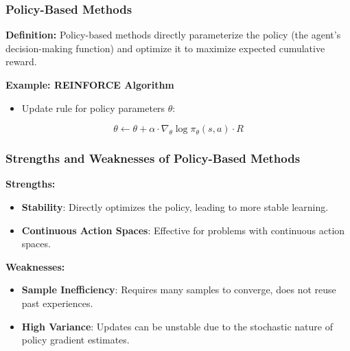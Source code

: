 \documentclass[aspectratio=169]{beamer}
\begin{document}
\begin{frame}[fragile]
    \frametitle{Policy-Based Methods}
    
    \textbf{Definition:} 
    Policy-based methods directly parameterize the policy (the agent's decision-making function) and optimize it to maximize expected cumulative reward.

    \textbf{Example: REINFORCE Algorithm}
    \begin{itemize}
        \item Update rule for policy parameters \( \theta \):
    \end{itemize}

    \begin{equation}
    \theta \leftarrow \theta + \alpha \cdot \nabla_\theta \log \pi_\theta(s, a) \cdot R
    \end{equation}
\end{frame}

\begin{frame}[fragile]
    \frametitle{Strengths and Weaknesses of Policy-Based Methods}

    \textbf{Strengths:}
    \begin{itemize}
        \item \textbf{Stability}: Directly optimizes the policy, leading to more stable learning.
        \item \textbf{Continuous Action Spaces}: Effective for problems with continuous action spaces.
    \end{itemize}

    \textbf{Weaknesses:}
    \begin{itemize}
        \item \textbf{Sample Inefficiency}: Requires many samples to converge, does not reuse past experiences.
        \item \textbf{High Variance}: Updates can be unstable due to the stochastic nature of policy gradient estimates.
    \end{itemize}
\end{frame}
\end{document}
